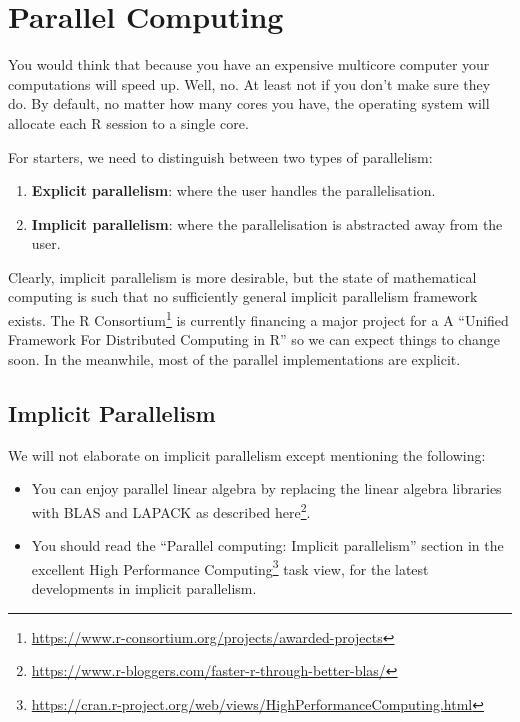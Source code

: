 \documentclass[]{book}
\providecommand{\tightlist}{%
  \setlength{\itemsep}{0pt}\setlength{\parskip}{0pt}}
\renewcommand{\href}[2]{#2\footnote{\url{#1}}}
\theoremstyle{definition}
\theoremstyle{definition}
\theoremstyle{definition}
\theoremstyle{remark}
\begin{document}
\hypertarget{parallel}{%
\chapter{Parallel Computing}\label{parallel}}

You would think that because you have an expensive multicore computer your computations will speed up.
Well, no.
At least not if you don't make sure they do.
By default, no matter how many cores you have, the operating system will allocate each R session to a single core.

For starters, we need to distinguish between two types of parallelism:

\begin{enumerate}
\def\labelenumi{\arabic{enumi}.}
\tightlist
\item
  \textbf{Explicit parallelism}: where the user handles the parallelisation.
\item
  \textbf{Implicit parallelism}: where the parallelisation is abstracted away from the user.
\end{enumerate}

Clearly, implicit parallelism is more desirable, but the state of mathematical computing is such that no sufficiently general implicit parallelism framework exists.
The \href{https://www.r-consortium.org/projects/awarded-projects}{R Consortium} is currently financing a major project for a A ``Unified Framework For Distributed Computing in R'' so we can expect things to change soon.
In the meanwhile, most of the parallel implementations are explicit.

\hypertarget{implicit-parallelism}{%
\section{Implicit Parallelism}\label{implicit-parallelism}}

We will not elaborate on implicit parallelism except mentioning the following:

\begin{itemize}
\tightlist
\item
  You can enjoy parallel linear algebra by replacing the linear algebra libraries with BLAS and LAPACK as described \href{https://www.r-bloggers.com/faster-r-through-better-blas/}{here}.
\item
  You should read the ``Parallel computing: Implicit parallelism'' section in the excellent \href{https://cran.r-project.org/web/views/HighPerformanceComputing.html}{High Performance Computing} task view, for the latest developments in implicit parallelism.
\end{itemize}
\end{document}
